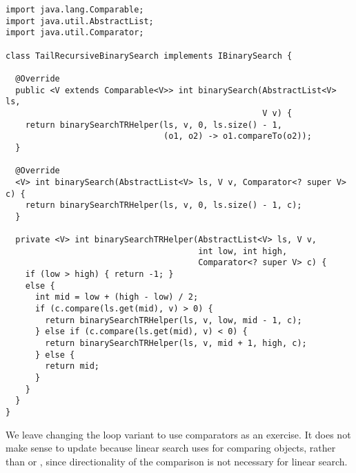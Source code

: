 \begin{lstlisting}[language=MyJava]
import java.lang.Comparable;
import java.util.AbstractList;
import java.util.Comparator;

class TailRecursiveBinarySearch implements IBinarySearch {
  
  @Override
  public <V extends Comparable<V>> int binarySearch(AbstractList<V> ls, 
                                                    V v) {
    return binarySearchTRHelper(ls, v, 0, ls.size() - 1,
                                (o1, o2) -> o1.compareTo(o2));
  }
  
  @Override
  <V> int binarySearch(AbstractList<V> ls, V v, Comparator<? super V> c) {
    return binarySearchTRHelper(ls, v, 0, ls.size() - 1, c);
  }
  
  private <V> int binarySearchTRHelper(AbstractList<V> ls, V v, 
                                       int low, int high,
                                       Comparator<? super V> c) {
    if (low > high) { return -1; } 
    else {
      int mid = low + (high - low) / 2;
      if (c.compare(ls.get(mid), v) > 0) { 
        return binarySearchTRHelper(ls, v, low, mid - 1, c); 
      } else if (c.compare(ls.get(mid), v) < 0) { 
        return binarySearchTRHelper(ls, v, mid + 1, high, c); 
      } else { 
        return mid; 
      }
    }
  }
}
\end{lstlisting}

We leave changing the loop variant to use comparators as an exercise. 
It does not make sense to update  because linear search uses  for comparing objects, rather than  or , since directionality of the comparison is not necessary for linear search.